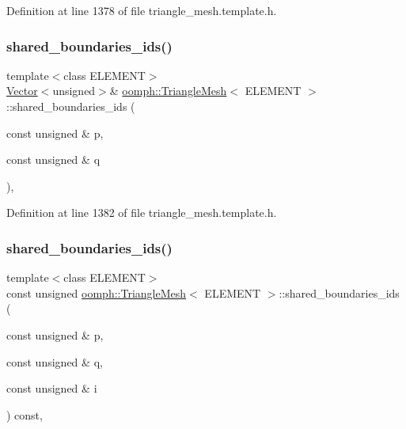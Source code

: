 Definition at line 1378 of file triangle\+\_\+mesh.\+template.\+h.

\mbox{\label{classoomph_1_1TriangleMesh_ad3de21bc0c42218a49b52d815fb8121e}} 
\subsubsection{\texorpdfstring{shared\+\_\+boundaries\+\_\+ids()}{shared\_boundaries\_ids()}\hspace{0.1cm}{\footnotesize\ttfamily [6/7]}}
{\footnotesize\ttfamily template$<$class E\+L\+E\+M\+E\+NT$>$ \\
\hyperlink{classoomph_1_1Vector}{Vector}$<$unsigned$>$\& \hyperlink{classoomph_1_1TriangleMesh}{oomph\+::\+Triangle\+Mesh}$<$ E\+L\+E\+M\+E\+NT $>$\+::shared\+\_\+boundaries\+\_\+ids (\begin{DoxyParamCaption}\item[{const unsigned \&}]{p,  }\item[{const unsigned \&}]{q }\end{DoxyParamCaption})\hspace{0.3cm}{\ttfamily [inline]}, {\ttfamily [protected]}}



Definition at line 1382 of file triangle\+\_\+mesh.\+template.\+h.

\mbox{\label{classoomph_1_1TriangleMesh_a31d4c906ddbb9b3aa830e32694870709}} 
\subsubsection{\texorpdfstring{shared\+\_\+boundaries\+\_\+ids()}{shared\_boundaries\_ids()}\hspace{0.1cm}{\footnotesize\ttfamily [7/7]}}
{\footnotesize\ttfamily template$<$class E\+L\+E\+M\+E\+NT$>$ \\
const unsigned \hyperlink{classoomph_1_1TriangleMesh}{oomph\+::\+Triangle\+Mesh}$<$ E\+L\+E\+M\+E\+NT $>$\+::shared\+\_\+boundaries\+\_\+ids (\begin{DoxyParamCaption}\item[{const unsigned \&}]{p,  }\item[{const unsigned \&}]{q,  }\item[{const unsigned \&}]{i }\end{DoxyParamCaption}) const\hspace{0.3cm}{\ttfamily [inline]}, {\ttfamily [protected]}}



